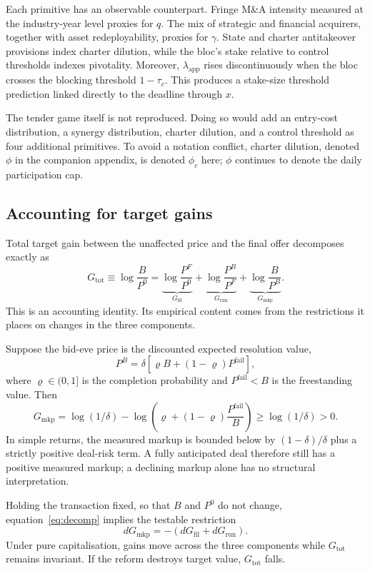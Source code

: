Each primitive has an observable counterpart. Fringe M\&A intensity measured at
the industry-year level proxies for $q$. The mix of strategic and financial
acquirers, together with asset redeployability, proxies for $\gamma$. State and
charter antitakeover provisions index charter dilution, while the bloc's stake
relative to control thresholds indexes pivotality. Moreover,
$\lambda_{\mathrm{app}}$ rises discontinuously when the bloc crosses
the blocking threshold $1-\tau_c$. This produces a stake-size threshold
prediction linked directly to the deadline through $x$.

The tender game itself is not reproduced. Doing so would add an entry-cost
distribution, a synergy distribution, charter dilution, and a control threshold
as four additional primitives. To avoid a notation conflict, charter dilution,
denoted $\phi$ in the companion appendix, is denoted $\phi_c$ here; $\phi$
continues to denote the daily participation cap.

\subsection{Accounting for target gains}
\label{sec:model-measurement}

Total target gain between the unaffected price and the final offer decomposes
exactly as
\begin{equation}
G_{\mathrm{tot}}
\equiv\log\!\frac{B}{P^0}
=\underbrace{\log\!\frac{P^F}{P^0}}_{G_{\mathrm{fil}}}
+\underbrace{\log\!\frac{P^B}{P^F}}_{G_{\mathrm{run}}}
+\underbrace{\log\!\frac{B}{P^B}}_{G_{\mathrm{mkp}}}.
\label{eq:decomp}
\end{equation}
This is an accounting identity. Its empirical content comes from the
restrictions it places on changes in the three components.

Suppose the bid-eve price is the discounted expected resolution value,
\[
P^B=\delta\left[\varrho B+(1-\varrho)P^{\mathrm{fail}}\right],
\]
where $\varrho\in(0,1]$ is the completion probability and
$P^{\mathrm{fail}}<B$ is the freestanding value. Then
\[
G_{\mathrm{mkp}}
=\log(1/\delta)
-\log\!\left(\varrho+(1-\varrho)\frac{P^{\mathrm{fail}}}{B}\right)
\geq\log(1/\delta)>0.
\]
In simple returns, the measured markup is bounded below by
$(1-\delta)/\delta$ plus a strictly positive deal-risk term. A fully anticipated
deal therefore still has a positive measured markup; a declining markup alone
has no structural interpretation.

Holding the transaction fixed, so that $B$ and $P^0$ do not change,
equation~\eqref{eq:decomp} implies the testable restriction
\begin{equation}
dG_{\mathrm{mkp}}
=-\left(dG_{\mathrm{fil}}+dG_{\mathrm{run}}\right).
\label{eq:invariance}
\end{equation}
Under pure capitalisation, gains move across the three components while
$G_{\mathrm{tot}}$ remains invariant. If the reform destroys target value,
$G_{\mathrm{tot}}$ falls.

